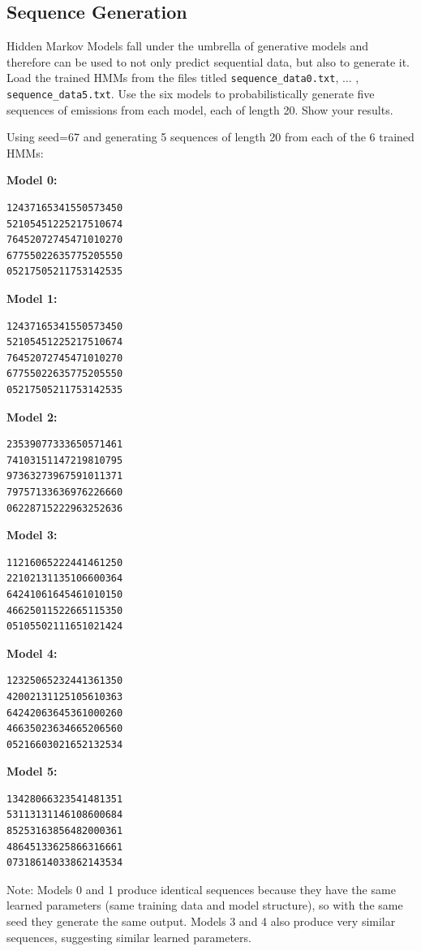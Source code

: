 \documentclass{article}
\begin{document}
\subsection{Sequence Generation}
Hidden Markov Models fall under the umbrella of generative models and therefore can be used to not only predict sequential data, but also to generate it. 
\problem[5] Load the trained HMMs from the files titled \texttt{sequence_data0.txt}, $\ldots$ , \texttt{sequence_data5.txt}. Use the six models to probabilistically generate five sequences of emissions from each model, each of length 20. Show your results. 
\begin{subsolution}

Using seed=67 and generating 5 sequences of length 20 from each of the 6 trained HMMs:

\textbf{Model 0:}
\begin{verbatim}
12437165341550573450
52105451225217510674
76452072745471010270
67755022635775205550
05217505211753142535
\end{verbatim}

\textbf{Model 1:}
\begin{verbatim}
12437165341550573450
52105451225217510674
76452072745471010270
67755022635775205550
05217505211753142535
\end{verbatim}

\textbf{Model 2:}
\begin{verbatim}
23539077333650571461
74103151147219810795
97363273967591011371
79757133636976226660
06228715222963252636
\end{verbatim}

\textbf{Model 3:}
\begin{verbatim}
11216065222441461250
22102131135106600364
64241061645461010150
46625011522665115350
05105502111651021424
\end{verbatim}

\textbf{Model 4:}
\begin{verbatim}
12325065232441361350
42002131125105610363
64242063645361000260
46635023634665206560
05216603021652132534
\end{verbatim}

\textbf{Model 5:}
\begin{verbatim}
13428066323541481351
53113131146108600684
85253163856482000361
48645133625866316661
07318614033862143534
\end{verbatim}

Note: Models 0 and 1 produce identical sequences because they have the same learned parameters (same training data and model structure), so with the same seed they generate the same output. Models 3 and 4 also produce very similar sequences, suggesting similar learned parameters.

\end{subsolution}
\newpage
\end{document}
